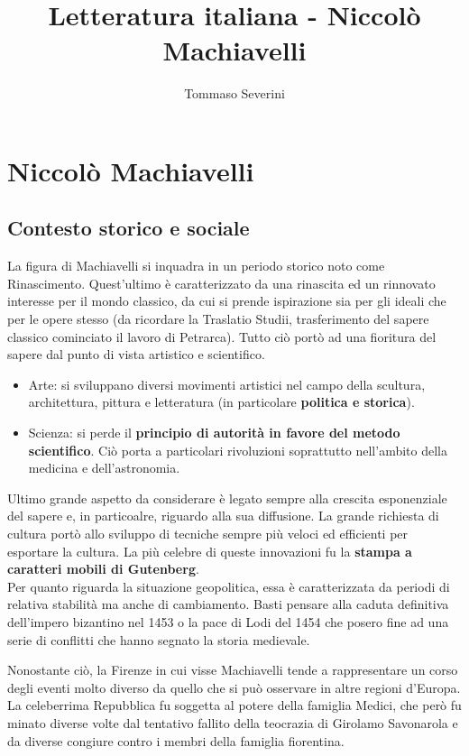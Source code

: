 \documentclass[10pt,a4paper]{report}
\author{Tommaso Severini}
\title{Letteratura italiana - Niccolò Machiavelli}
\begin{document}
	\maketitle
	
	\chapter*{Niccolò Machiavelli}
	
	\section*{Contesto storico e sociale}
	
	La figura di Machiavelli si inquadra in un periodo storico noto come Rinascimento. Quest'ultimo è caratterizzato da una rinascita ed un rinnovato interesse per il mondo classico, da cui si prende ispirazione sia per gli ideali che per le opere stesso (da ricordare la Traslatio Studii, trasferimento del sapere classico cominciato il lavoro di Petrarca).
	Tutto ciò portò ad una fioritura del sapere dal punto di vista artistico e scientifico.
	
	\begin{itemize}
		\item Arte: si sviluppano diversi movimenti artistici nel campo della scultura, architettura, pittura e letteratura (in particolare \textbf{politica e storica}).
		\item Scienza: si perde il \textbf{principio di autorità in favore del metodo scientifico}. Ciò porta a particolari rivoluzioni soprattutto nell'ambito della medicina e dell'astronomia.
	\end{itemize}

	Ultimo grande aspetto da considerare è legato sempre alla crescita esponenziale del sapere e, in particoalre, riguardo alla sua diffusione. La grande richiesta di cultura portò allo sviluppo di tecniche sempre più veloci ed efficienti per esportare la cultura. La più celebre di queste innovazioni fu la \textbf{stampa a caratteri mobili di Gutenberg}.\\
	
	Per quanto riguarda la situazione geopolitica, essa è caratterizzata da periodi di relativa stabilità ma anche di cambiamento. Basti pensare alla caduta definitiva dell'impero bizantino nel 1453 o la pace di Lodi del 1454 che posero fine ad una serie di conflitti che hanno segnato la storia medievale.
	
	Nonostante ciò, la Firenze in cui visse Machiavelli tende a rappresentare un corso degli eventi molto diverso da quello che si può osservare in altre regioni d'Europa. La celeberrima Repubblica fu soggetta al potere della famiglia Medici, che però fu minato diverse volte dal tentativo fallito della teocrazia di Girolamo Savonarola e da diverse congiure contro i membri della famiglia fiorentina.
	
\end{document}
